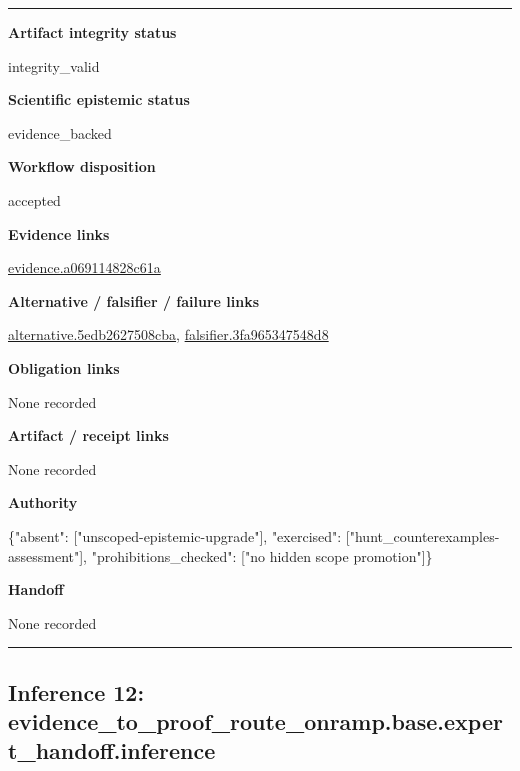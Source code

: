 \documentclass[10pt,a4paper]{article}
\newcommand{\TraceField}[2]{\par\noindent\textbf{#1}\par\noindent #2\par\smallskip}
\newenvironment{TraceDossier}{\par\medskip\noindent\hrule\medskip}{\medskip\hrule\par\medskip}
\begin{document}
\begin{TraceDossier}
\TraceField{Artifact integrity status}{integrity\_\allowbreak{}valid}

\TraceField{Scientific epistemic status}{evidence\_\allowbreak{}backed}

\TraceField{Workflow disposition}{accepted}

\TraceField{Evidence links}{\hyperlink{trace-evidence-65b76b3e25d101953a}{evidence.\allowbreak{}a069114828\allowbreak{}c61a}}

\TraceField{Alternative / falsifier / failure links}{\hyperlink{trace-alternative-e33b2e27d19a2edcc6}{alternativ\allowbreak{}e.\allowbreak{}5edb262750\allowbreak{}8cba}, \hyperlink{trace-alternative-6df0cbbd30739d278c}{falsifier.\allowbreak{}3fa9653475\allowbreak{}48d8}}

\TraceField{Obligation links}{None recorded}

\TraceField{Artifact / receipt links}{None recorded}

\TraceField{Authority}{\{"absent":\allowbreak{} ["unscoped\allowbreak{}-\allowbreak{}epistemic-\allowbreak{}upgrade"],\allowbreak{} "exercised\allowbreak{}":\allowbreak{} ["hunt\_\allowbreak{}counterexa\allowbreak{}mples-\allowbreak{}assessment\allowbreak{}"], "prohibiti\allowbreak{}ons\_\allowbreak{}checked":\allowbreak{} ["no hidden scope promotion"\allowbreak{}]\}}

\TraceField{Handoff}{None recorded}

\end{TraceDossier}
\pagebreak[2]\subsection{Inference 12: evidence\_\allowbreak{}to\_\allowbreak{}proof\_\allowbreak{}route\_\allowbreak{}onramp.\allowbreak{}base.\allowbreak{}expert\_\allowbreak{}handoff.\allowbreak{}inference}\label{trace-inference-c1c2e64ffcfad92bf8}
\end{document}
